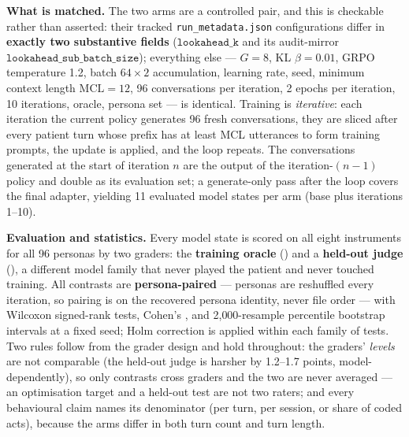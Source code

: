 \textbf{What is matched.} The two arms are a controlled pair, and this is checkable rather than
asserted: their tracked \texttt{run\_metadata.json} configurations differ in \textbf{exactly two
substantive fields} ($\texttt{lookahead\_k}$ and its audit-mirror
$\texttt{lookahead\_sub\_batch\_size}$); everything else --- $G{=}8$, KL $\beta{=}0.01$, GRPO
temperature 1.2, batch $64 \times 2$ accumulation, learning rate, seed, minimum context length
$\text{MCL}{=}12$, 96 conversations per iteration, 2 epochs per iteration, 10 iterations, oracle,
persona set --- is identical. Training is \emph{iterative}: each iteration the current policy
generates 96 fresh conversations, they are sliced after every patient turn whose prefix has at
least MCL utterances to form training prompts, the update is applied, and the loop repeats. The
conversations generated at the start of iteration $n$ are the output of the iteration-$(n{-}1)$
policy and double as its evaluation set; a generate-only pass after the loop covers the final
adapter, yielding 11 evaluated model states per arm (base plus iterations 1--10).

\textbf{Evaluation and statistics.} Every model state is scored on all eight instruments for all
96 personas by two graders: the \textbf{training oracle} (\primaryjudge) and a \textbf{held-out
judge} (\heldoutjudge), a different model family that never played the patient and never touched
training. All contrasts are \textbf{persona-paired} --- personas are reshuffled every iteration,
so pairing is on the recovered persona identity, never file order --- with Wilcoxon signed-rank
tests, Cohen's \dz, and 2{,}000-resample percentile bootstrap intervals at a fixed seed; Holm
correction is applied within each family of tests. Two rules follow from the grader design and hold
throughout: the graders' \emph{levels} are not comparable (the held-out judge is harsher by
1.2--1.7 points, model-dependently), so only contrasts cross graders and the two are never
averaged --- an optimisation target and a held-out test are not two raters; and every behavioural
claim names its denominator (per turn, per session, or share of coded acts), because the arms
differ in both turn count and turn length.
